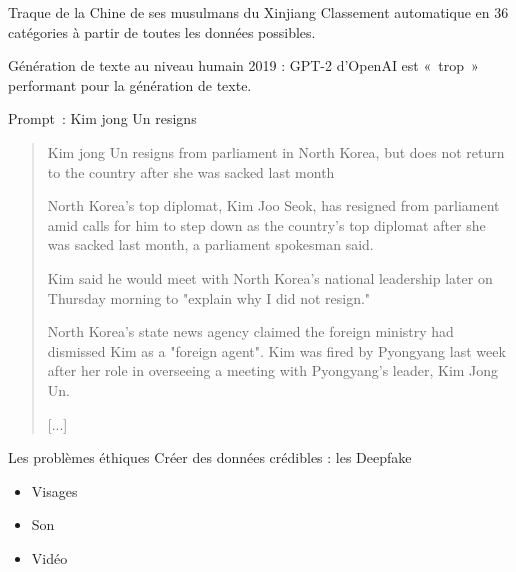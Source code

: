\begin{frame}{Traque de la Chine de ses musulmans du Xinjiang}
  Classement automatique en 36 catégories à partir de toutes les données possibles.

\end{frame}

\begin{frame}{Génération de texte au niveau humain}
  2019 : GPT-2 d'OpenAI est «~trop~» performant pour la génération de texte.

  Prompt~: Kim jong Un resigns
  \begin{quote}
    Kim jong Un resigns from parliament in North Korea, 
    but does not return to the country after she was sacked last month
      
    North Korea's top diplomat, Kim Joo Seok, has resigned from parliament amid calls for him
    to step down as the country's top diplomat after she was sacked last month, 
    a parliament spokesman said.
    
    Kim said he would meet with North Korea's national leadership later on Thursday morning 
    to "explain why I did not resign."
    
    North Korea's state news agency claimed the foreign ministry had dismissed Kim as a 
    "foreign agent". Kim was fired by Pyongyang last week after her role in overseeing 
    a meeting with Pyongyang's leader, Kim Jong Un. 
    
    [...]
  \end{quote}
\end{frame}

\begin{frame}{Les problèmes éthiques}
  Créer des données crédibles : les Deepfake 
  \begin{itemize}
    \item Visages
    \item Son
    \item Vidéo 
  \end{itemize}
\end{frame}

